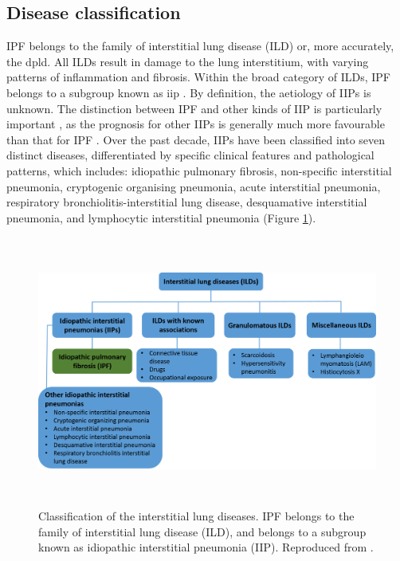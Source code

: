 \subsection{Disease classification} 
IPF belongs to the family of interstitial lung disease (ILD) or, more accurately, the \gls{dpld}. All ILDs result in damage to the lung interstitium, with varying patterns of inflammation and fibrosis. Within the broad category of ILDs, IPF belongs to a subgroup known as \gls{iip} \citep{meltzer2008idiopathic}. By definition, the aetiology of IIPs is unknown. The distinction between IPF and other kinds of IIP is particularly important \citep{corte2015idiopathic, troy2012management}, as the prognosis for other IIPs is generally much more favourable than that for IPF \citep{meltzer2008idiopathic}. Over the past decade, IIPs have been classified into seven distinct diseases, differentiated by specific clinical features and pathological patterns, which includes: idiopathic pulmonary fibrosis, non-specific interstitial pneumonia, cryptogenic organising pneumonia, acute interstitial pneumonia, respiratory bronchiolitis-interstitial lung disease, desquamative interstitial pneumonia, and lymphocytic interstitial pneumonia \citep{katzenstein1998idiopathic, troy2012management} (Figure \ref{fig:DiseaseClassification}).

\begin{figure}[htbp]
  \centering 
  \includegraphics[height=3.5in]{Background/Image/DiseaseClassification.png}
  \caption{Classification of the interstitial lung diseases. IPF belongs to the family of interstitial lung disease (ILD), and belongs to a subgroup known as idiopathic interstitial pneumonia (IIP). Reproduced from \citep{troy2012management}.}
  \label{fig:DiseaseClassification}
\end{figure}

